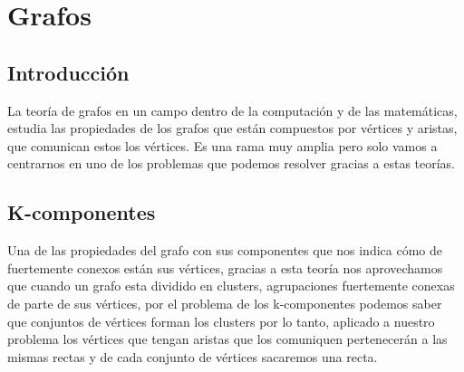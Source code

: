\section{Grafos}	
\subsection{Introducción}
La teoría de grafos\cite{Wiki:Grafos} en un campo dentro de la computación y de las matemáticas, estudia las propiedades de los grafos que están compuestos por vértices y aristas, que comunican estos los vértices.
Es una rama muy amplia pero solo vamos a centrarnos en uno de los problemas que podemos resolver gracias a estas teorías.

\subsection{K-componentes}
Una de las propiedades del grafo con sus componentes que nos indica cómo de fuertemente conexos están sus vértices, gracias a esta teoría nos aprovechamos que cuando un grafo esta dividido en clusters, agrupaciones fuertemente conexas de parte de sus vértices, por el problema de los k-componentes podemos saber que conjuntos de vértices forman los clusters por lo tanto, aplicado a nuestro problema los vértices que tengan aristas que los comuniquen pertenecerán a las mismas rectas y de cada conjunto de vértices sacaremos una recta.